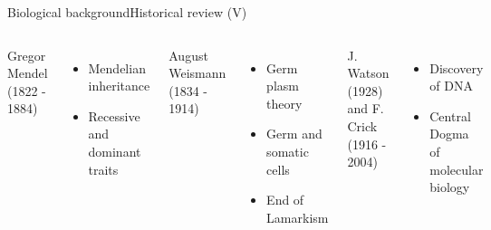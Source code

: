 \documentclass[10pt,compress]{beamer} %
\begin{document}
\begin{frame}{Biological background}{Historical review (V)}
 	\begin{columns}
		Gregor Mendel (1822 - 1884)
		\begin{itemize}
		\item Mendelian inheritance
		\item Recessive and dominant traits
		\end{itemize}


		August Weismann (1834 - 1914)
 	 	\begin{itemize}
		\item Germ plasm theory
		\item Germ and somatic cells
		\item End of Lamarkism
		\end{itemize}
		
		J. Watson (1928) and F. Crick (1916 - 2004)
 	 	\begin{itemize}
		\item Discovery of DNA
		\item Central Dogma of molecular biology
		\end{itemize}



\end{columns}
\end{frame}
\end{document}
